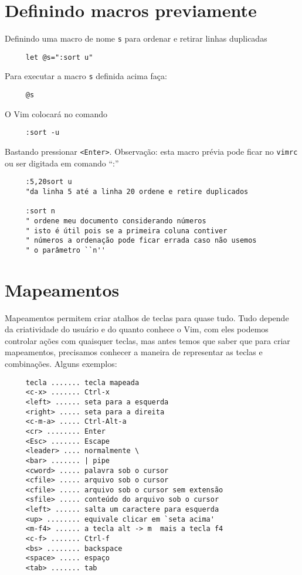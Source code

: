 \section{Definindo macros previamente}
\label{Definindo macros previamente}
Definindo uma macro de nome \verb|s| para ordenar e retirar linhas duplicadas

\begin{verbatim}
     let @s=":sort u"
\end{verbatim}

Para executar a macro \verb|s| definida acima faça:

\begin{verbatim}
     @s
\end{verbatim}

O Vim colocará no comando

\begin{verbatim}
     :sort -u
\end{verbatim}

Bastando pressionar \verb|<Enter>|.
Observação: esta macro prévia pode ficar no {\tt vimrc} ou ser digitada em comando ``:''


\begin{verbatim}
     :5,20sort u
     "da linha 5 até a linha 20 ordene e retire duplicados
     
     :sort n
     " ordene meu documento considerando números
     " isto é útil pois se a primeira coluna contiver
     " números a ordenação pode ficar errada caso não usemos
     " o parâmetro ``n''
\end{verbatim}

\section{Mapeamentos}\label{Mapeamentos}

Mapeamentos permitem criar atalhos de teclas para quase tudo. Tudo depende da
criatividade do usuário e do quanto conhece o Vim, com eles podemos controlar ações
com quaisquer teclas, mas antes temos que saber que para criar mapeamentos,
precisamos conhecer a maneira de representar as teclas e combinações. Alguns
exemplos:

\begin{verbatim}
     tecla ....... tecla mapeada
     <c-x> ....... Ctrl-x
     <left> ...... seta para a esquerda
     <right> ..... seta para a direita
     <c-m-a> ..... Ctrl-Alt-a
     <cr> ........ Enter
     <Esc> ....... Escape
     <leader> .... normalmente \
     <bar> ....... | pipe
     <cword> ..... palavra sob o cursor
     <cfile> ..... arquivo sob o cursor
     <cfile> ..... arquivo sob o cursor sem extensão
     <sfile> ..... conteúdo do arquivo sob o cursor
     <left> ...... salta um caractere para esquerda
     <up> ........ equivale clicar em `seta acima'
     <m-f4> ...... a tecla alt -> m  mais a tecla f4
     <c-f> ....... Ctrl-f
     <bs> ........ backspace
     <space> ..... espaço
     <tab> ....... tab
\end{verbatim}

